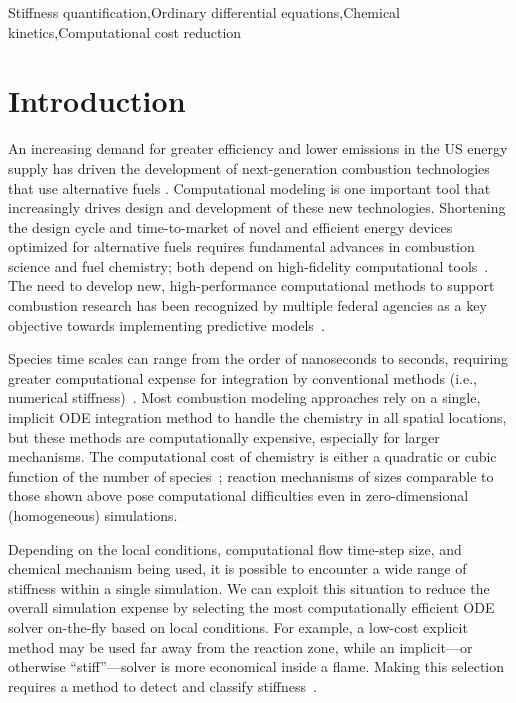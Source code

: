 \documentclass[12pt]{ussci}
\begin{document}
\begin{keyword}
    Stiffness quantification\sep Ordinary differential equations\sep Chemical kinetics\sep Computational cost reduction
\end{keyword}

\section{Introduction}
%

An increasing demand for greater efficiency and lower  emissions in the US energy supply has driven the development of next-generation combustion technologies that use alternative fuels \cite{Epstein2012}.
Computational modeling is one important tool that increasingly drives design and development of these new technologies.
Shortening the design cycle and time-to-market of novel and efficient energy devices optimized for alternative fuels requires fundamental advances in combustion science and fuel chemistry; both depend on high-fidelity computational tools~\cite{Niemeyer}.
The need to develop new, high-performance computational methods to support combustion research has been recognized by multiple federal agencies as a key objective towards implementing predictive models~\cite{Trouve:2006tq,DOE:2007tj,NationalResearchCouncil:2011ub,National-Research-Council:2014aa}.

Species time scales can range from the order of nanoseconds to seconds, requiring greater computational expense for integration by conventional methods (i.e., numerical stiffness)~\cite{Lu2009}.
Most combustion modeling approaches rely on a single, implicit ODE integration method to handle the chemistry in all spatial locations, but these methods are computationally expensive, especially for larger mechanisms.
The computational cost of chemistry is either a quadratic or cubic function of the number of species~\cite{Lu2009}; reaction mechanisms of sizes comparable to those shown above pose computational difficulties even in zero-dimensional (homogeneous) simulations.

Depending on the local conditions, computational flow time-step size, and chemical mechanism being used, it is possible to encounter a wide range of stiffness within a single simulation.
We can exploit this situation to reduce the overall simulation expense by selecting the most computationally efficient ODE solver on-the-fly based on local conditions.
For example, a low-cost explicit method may be used far away from the reaction zone, while an implicit---or otherwise ``stiff''---solver is more economical inside a flame.
Making this selection requires a method to detect and classify stiffness~\cite{Niemeyer}.
\end{document}
